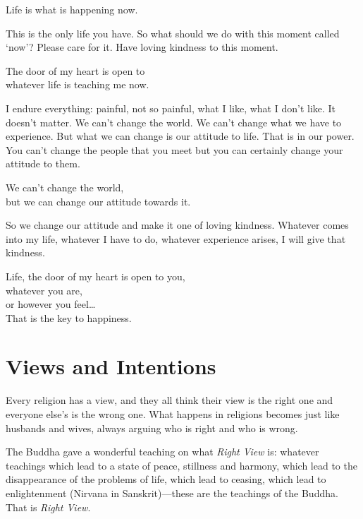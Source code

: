 \documentclass[12pt, openany]{book}
\newenvironment{aphorism}%
{%
\begin{center}\begin{itshape}
}%
{\end{itshape}\end{center}
}%
\newcommand{\fleuron}{%
\begin{center}
\vspace{2em}
\fallbackfont{❦}
\end{center}
}
\begin{document}
\begin{aphorism}
Life is what is happening now.
\end{aphorism}

This is the only life you have. So what should we do with this moment called ‘now’? Please care for it. Have loving kindness to this moment. 

\begin{aphorism}
The door of my heart is open to\\  
whatever life is teaching me now.
\end{aphorism}

I endure everything: painful, not so painful, what I like, what I don’t like. It doesn’t matter. We can’t change the world. We can’t change what we have to experience. But what we can change is our attitude to life. That is in our power. You can’t change the people that you meet but you can certainly change your attitude to them. 

\begin{aphorism}
We can’t change the world,\\  
but we can change our attitude towards it.
\end{aphorism}

So we change our attitude and make it one of loving kindness. Whatever comes into my life, whatever I have to do, whatever experience arises, I will give that kindness. 

\begin{aphorism}
Life, the door of my heart is open to you,\\  
whatever you are,\\ 
or however you feel…\\  
That is the key to happiness.
\end{aphorism}

\fleuron

\chapter{Views and Intentions} 

Every religion has a view, and they all think their view is the right one and everyone else’s is the wrong one. What happens in religions becomes just like husbands and wives, always arguing who is right and who is wrong. 

The Buddha gave a wonderful teaching on what \emph{Right View} is: whatever teachings which lead to a state of peace, stillness and harmony, which lead to the disappearance of the problems of life, which lead to ceasing, which lead to enlightenment (Nirvana in Sanskrit)—these are the teachings of the Buddha. That is \emph{Right View}. 
\end{document}
